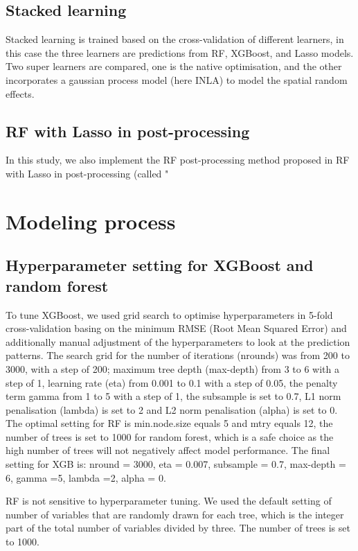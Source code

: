 \documentclass{article}
\begin{document}
\subsection{Stacked learning}
Stacked learning is trained based on the cross-validation of different learners, in this case the three learners are predictions from RF, XGBoost, and Lasso models. Two super learners are compared, one is the native optimisation, and the other incorporates a gaussian process model (here INLA) to model the spatial random effects. 

\subsection{RF with Lasso in post-processing}

In this study, we also implement the RF post-processing method proposed in \cite{hastie2009elements} RF with Lasso in post-processing (called "



\section{Modeling process}

\subsection{Hyperparameter setting for XGBoost and random forest}
\label{sec:hp}

To tune XGBoost, we used grid search to optimise hyperparameters in 5-fold cross-validation basing on the minimum RMSE (Root Mean Squared Error) and additionally manual adjustment of the hyperparameters to look at the prediction patterns. The search grid for the number of iterations (nrounds) was from 200 to 3000, with a step of 200; maximum tree depth (max-depth) from 3 to 6 with a step of 1, learning rate (eta) from 0.001 to 0.1 with a step of 0.05, the penalty term gamma \citep{xgboost}  from 1 to 5 with a step of 1, the subsample is set to 0.7, L1 norm penalisation (lambda) is set to 2 and L2 norm penalisation (alpha) is set to 0.  The optimal setting for RF is min.node.size equals 5 and mtry equals 12, the number of trees is set to 1000 for random forest, which is a safe choice as the high number of trees will not negatively affect model performance. The final setting for XGB is: nround = 3000, eta = 0.007, subsample = 0.7, max-depth = 6, gamma =5, lambda =2, alpha = 0. 

RF is not sensitive to hyperparameter tuning. We used the default setting of number of variables that are randomly drawn for each tree\citep{breiman2001random}, which is the integer part of the total number of variables divided by three. The number of trees is set to 1000. 
\end{document}
